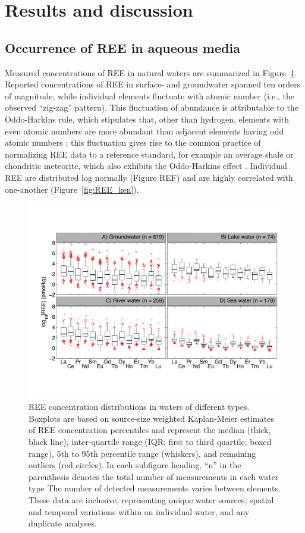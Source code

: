 \section{Results and discussion}

\subsection{Occurrence of REE in aqueous media}

Measured concentrations of REE in natural waters are summarized in Figure~\ref{fig:all_waters}.
Reported concentrations of REE in surface- and groundwater spanned ten orders of magnitude, while individual elements fluctuate with atomic number (i.e., the observed ``zig-zag'' pattern).
This fluctuation of abundance is attributable to the Oddo-Harkins rule, which stipulates that, other than hydrogen, elements with even atomic numbers are more abundant than adjacent elements having odd atomic numbers \citep{Harkins};
this fluctuation gives rise to the common practice of normalizing REE data to a reference standard, for example an average shale or chondritic meteorite, which also exhibits the Oddo-Harkins effect \citep{McLennan_GCA_1994}.
Individual REE are distributed log normally (Figure REF) and are highly correlated with one-another (Figure~\ref{fig:REE_ken}).

\begin{figure}[htbp]
\begin{center}
\includegraphics[width=\textwidth]{Ch3_figures/REE-water-boxplot.pdf}
\caption{REE concentration distributions in waters of different types.
Boxplots are based on source-size weighted Kaplan-Meier estimates of REE concentration percentiles and represent the median (thick, black line), inter-quartile range (IQR; first to third quartile; boxed range), 5th to 95th percentile range (whiskers), and remaining outliers (red circles).
In each subfigure heading, ``n'' in the parenthesis denotes the total number of measurements in each water type The number of detected measurements varies between elements.
These data are inclusive, representing unique water sources, spatial and temporal variations within an individual water, and any duplicate analyses.}\label{fig:all_waters}
\end{center}
\end{figure}

